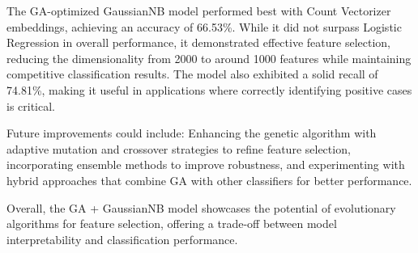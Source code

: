 The GA-optimized GaussianNB model performed best with Count Vectorizer embeddings, achieving an accuracy of 66.53\%. While it did not surpass Logistic Regression in overall performance, it demonstrated effective feature selection, reducing the dimensionality from 2000 to around 1000 features while maintaining competitive classification results. The model also exhibited a solid recall of 74.81\%, making it useful in applications where correctly identifying positive cases is critical.

Future improvements could include: Enhancing the genetic algorithm with adaptive mutation and crossover strategies to refine feature selection, incorporating ensemble methods to improve robustness, and experimenting with hybrid approaches that combine GA with other classifiers for better performance.

Overall, the GA + GaussianNB model showcases the potential of evolutionary algorithms for feature selection, offering a trade-off between model interpretability and classification performance.

